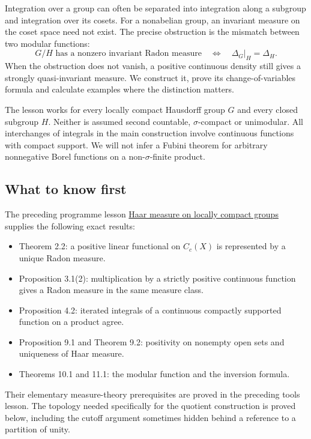 \documentclass[
  english,
  11pt,
  a4paper,
]{article}
\newcounter{none} %
\providecommand{\tightlist}{%
  \setlength{\itemsep}{0pt}\setlength{\parskip}{0pt}}
\begin{document}
Integration over a group can often be separated into integration along a
subgroup and integration over its cosets. For a nonabelian group, an
invariant measure on the coset space need not exist. The precise
obstruction is the mismatch between two modular functions:
\[G/H\text{ has a nonzero invariant Radon measure}
\quad\Longleftrightarrow\quad
\Delta_G|_H=\Delta_H.\] When the obstruction does not vanish, a positive
continuous density still gives a strongly quasi-invariant measure. We
construct it, prove its change-of-variables formula and calculate
examples where the distinction matters.

The lesson works for every locally compact Hausdorff group \(G\) and
every closed subgroup \(H\). Neither is assumed second countable,
\(\sigma\)-compact or unimodular. All interchanges of integrals in the
main construction involve continuous functions with compact support. We
will not infer a Fubini theorem for arbitrary nonnegative Borel
functions on a non-\(\sigma\)-finite product.

\subsection{What to know
first}\label{quotient-measures-and-weils-integration-formula--what-to-know-first}

The preceding programme lesson
\hyperref[haar-measure-on-locally-compact-groups]{Haar measure on
locally compact groups} supplies the following exact results:

\begin{itemize}
\tightlist
\item
  Theorem 2.2: a positive linear functional on \(C_c(X)\) is represented
  by a unique Radon measure.
\item
  Proposition 3.1(2): multiplication by a strictly positive continuous
  function gives a Radon measure in the same measure class.
\item
  Proposition 4.2: iterated integrals of a continuous compactly
  supported function on a product agree.
\item
  Proposition 9.1 and Theorem 9.2: positivity on nonempty open sets and
  uniqueness of Haar measure.
\item
  Theorems 10.1 and 11.1: the modular function and the inversion
  formula.
\end{itemize}

Their elementary measure-theory prerequisites are proved in the
preceding tools lesson. The topology needed specifically for the
quotient construction is proved below, including the cutoff argument
sometimes hidden behind a reference to a partition of unity.
\end{document}
